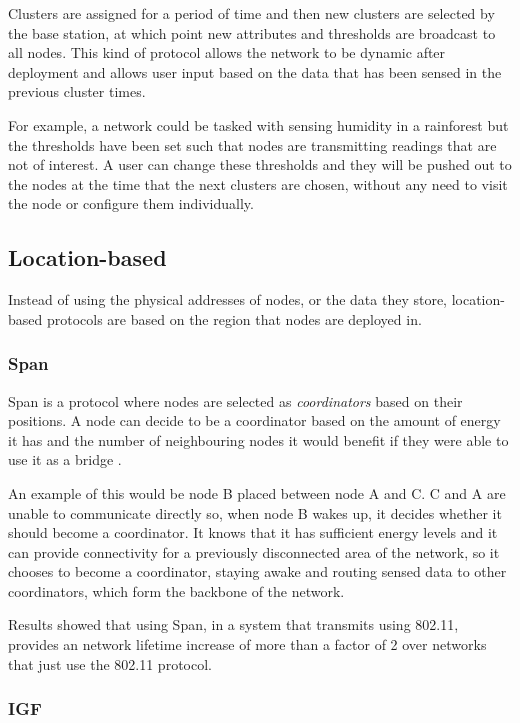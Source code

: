 Clusters are assigned for a period of time and then new clusters are selected by the base station, at which point new attributes and thresholds are broadcast to all nodes. This kind of protocol allows the network to be dynamic after deployment and allows user input based on the data that has been sensed in the previous cluster times. 

For example, a network could be tasked with sensing humidity in a rainforest but the thresholds have been set such that nodes are transmitting readings that are not of interest. A user can change these thresholds and they will be pushed out to the nodes at the time that the next clusters are chosen, without any need to visit the node or configure them individually.

\subsection{Location-based}
	Instead of using the physical addresses of nodes, or the data they store, location-based protocols are based on the region that nodes are deployed in.

\subsubsection{Span}
	Span is a protocol where nodes are selected as \textit{coordinators} based on their positions. A node can decide to be a coordinator based on the amount of energy it has and the number of neighbouring nodes it would benefit if they were able to use it as a bridge \cite{Chen2002}.

An example of this would be node B placed between node A and C. C and A are unable to communicate directly so, when node B wakes up, it decides whether it should become a coordinator. It knows that it has sufficient energy levels and it can provide connectivity for a previously disconnected area of the network, so it chooses to become a coordinator, staying awake and routing sensed data to other coordinators, which form the backbone of the network.

Results showed that using Span, in a system that transmits using 802.11, provides an network lifetime increase of more than a factor of 2 over networks that just use the 802.11 protocol.

\subsubsection{IGF}
	

